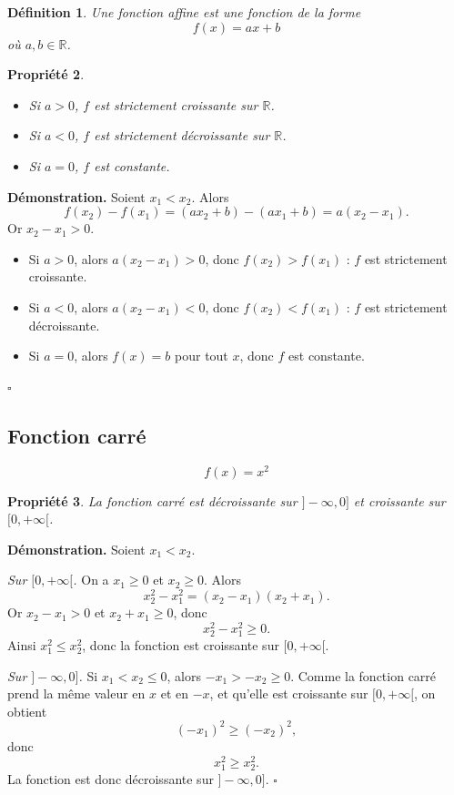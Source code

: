 \documentclass[11pt,a4paper]{article}
\newtheorem{definition}{Définition}[section]
\newtheorem{propriete}[definition]{Propriété}
\newcommand{\R}{\mathbb{R}}
\begin{document}
\begin{definition}
Une fonction affine est une fonction de la forme
\[
f(x)=ax+b
\]
où \(a,b\in\R\).
\end{definition}

\begin{propriete}
\begin{itemize}
    \item Si \(a>0\), \(f\) est strictement croissante sur \(\R\).
    \item Si \(a<0\), \(f\) est strictement décroissante sur \(\R\).
    \item Si \(a=0\), \(f\) est constante.
\end{itemize}
\end{propriete}

\textbf{Démonstration.}  
Soient \(x_1<x_2\). Alors
\[
f(x_2)-f(x_1)=(ax_2+b)-(ax_1+b)=a(x_2-x_1).
\]
Or \(x_2-x_1>0\).

\begin{itemize}
    \item Si \(a>0\), alors \(a(x_2-x_1)>0\), donc \(f(x_2)>f(x_1)\) : \(f\) est strictement croissante.
    \item Si \(a<0\), alors \(a(x_2-x_1)<0\), donc \(f(x_2)<f(x_1)\) : \(f\) est strictement décroissante.
    \item Si \(a=0\), alors \(f(x)=b\) pour tout \(x\), donc \(f\) est constante.
\end{itemize}
\(\square\)

\subsection{Fonction carré}

\[
f(x)=x^2
\]

\begin{propriete}
La fonction carré est décroissante sur \(]-\infty,0]\) et croissante sur \([0,+\infty[\).
\end{propriete}

\textbf{Démonstration.}  
Soient \(x_1<x_2\).

\emph{Sur \([0,+\infty[\).}  
On a \(x_1\ge 0\) et \(x_2\ge 0\). Alors
\[
x_2^2-x_1^2=(x_2-x_1)(x_2+x_1).
\]
Or \(x_2-x_1>0\) et \(x_2+x_1\ge 0\), donc
\[
x_2^2-x_1^2\ge 0.
\]
Ainsi \(x_1^2\le x_2^2\), donc la fonction est croissante sur \([0,+\infty[\).

\emph{Sur \(]-\infty,0]\).}  
Si \(x_1<x_2\le 0\), alors \(-x_1>-x_2\ge 0\). Comme la fonction carré prend la même valeur en \(x\) et en \(-x\), et qu'elle est croissante sur \([0,+\infty[\), on obtient
\[
(-x_1)^2\ge (-x_2)^2,
\]
donc
\[
x_1^2\ge x_2^2.
\]
La fonction est donc décroissante sur \(]-\infty,0]\). \(\square\)
\end{document}
